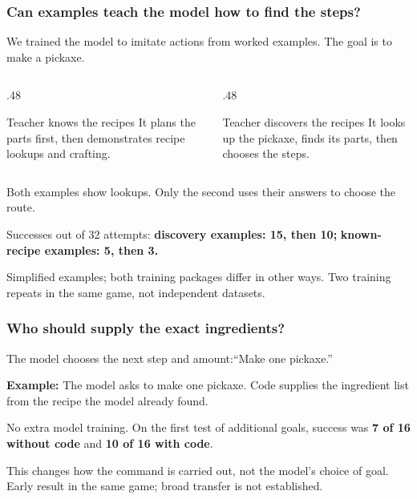 \documentclass[aspectratio=169,12pt]{beamer}
\newcommand{\aside}[1]{\vfill{\footnotesize\color{Gray}#1\par}}
\begin{document}
\begin{frame}[t]
\frametitle{Can examples teach the model how to find the steps?}
We trained the model to imitate actions from worked examples. The goal is to make a pickaxe.
\begin{columns}[T,onlytextwidth]
\begin{column}{.48\textwidth}
\begin{block}{Teacher knows the recipes}
It plans the parts first, then demonstrates recipe lookups and crafting.
\end{block}
\end{column}
\begin{column}{.48\textwidth}
\begin{block}{Teacher discovers the recipes}
It looks up the pickaxe, finds its parts, then chooses the steps.
\end{block}
\end{column}
\end{columns}
Both examples show lookups. Only the second uses their answers to choose the route.
\medskip

Successes out of 32 attempts: \textbf{discovery examples: 15, then 10;} \textbf{known-recipe examples: 5, then 3.}
\aside{Simplified examples; both training packages differ in other ways. Two training repeats in the same game, not independent datasets.}
\end{frame}

\begin{frame}[t]
\frametitle{Who should supply the exact ingredients?}
The model chooses the next step and amount:\quad ``Make one pickaxe.''
\begin{center}
\end{center}
\textbf{Example:} The model asks to make one pickaxe. Code supplies the ingredient list from the recipe the model already found.
\medskip

No extra model training. On the first test of additional goals, success was \textbf{7 of 16 without code} and \textbf{10 of 16 with code}.
\aside{This changes how the command is carried out, not the model's choice of goal. Early result in the same game; broad transfer is not established.}
\end{frame}
\end{document}
